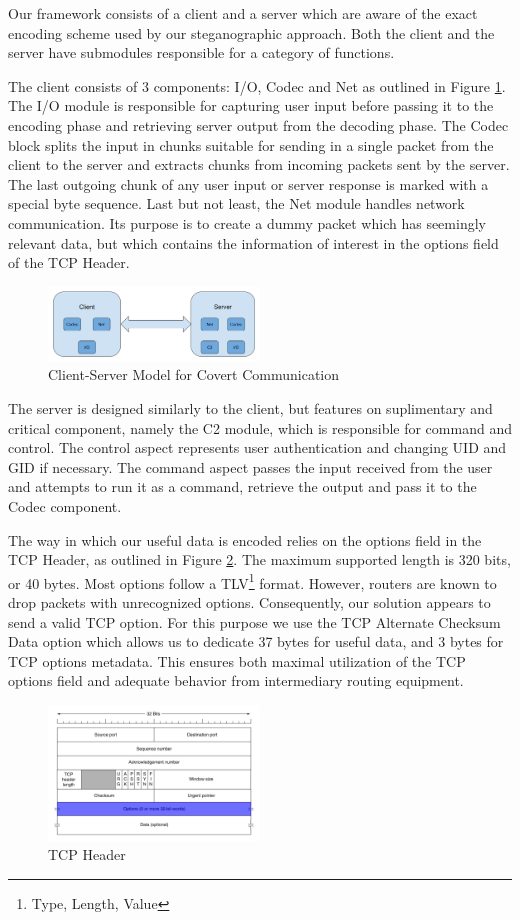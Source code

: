 
Our framework consists of a client and a server which are aware of the exact
encoding scheme used by our steganographic approach. Both the client and the
server have submodules responsible for a category of functions.

The client consists of 3 components: I/O, Codec and Net as outlined in Figure
\ref{fig:architecture}. The I/O module is responsible for capturing user input
before passing it to the encoding phase and retrieving server output from the
decoding phase. The Codec block splits the input in chunks suitable for sending
in a single packet from the client to the server and extracts chunks from
incoming packets sent by the server. The last outgoing chunk of any user input
or server response is marked with a special byte sequence. Last but not least,
the Net module handles network communication. Its purpose is to create a dummy
packet which has seemingly relevant data, but which contains the information of
interest in the options field of the TCP Header.

\begin{figure}
  \centering
  \includegraphics[width=0.5\textwidth]{img/client-server-architecture}
  \caption{Client-Server Model for Covert Communication}
  \label{fig:architecture}
\end{figure}

The server is designed similarly to the client, but features on suplimentary
and critical component, namely the C2 module, which is responsible for command
and control. The control aspect represents user authentication and changing
UID and GID if necessary. The command aspect passes the input received from the
user and attempts to run it as a command, retrieve the output and pass it to the
Codec component.

The way in which our useful data is encoded relies on the options field in the
TCP Header, as outlined in Figure \ref{fig:tcp-header}. The maximum supported
length is 320 bits, or 40 bytes. Most options follow a TLV\footnote{Type, Length, Value}
format. However, routers are known to drop packets with unrecognized options.
Consequently, our solution appears to send a valid TCP option. For this
purpose we use the TCP Alternate Checksum Data option which allows us to
dedicate 37 bytes for useful data, and 3 bytes for TCP options metadata.
This ensures both maximal utilization of the TCP options field and adequate
behavior from intermediary routing equipment.

\begin{figure}
  \centering
  \includegraphics[width=0.5\textwidth]{img/tcp-header}
  \caption{TCP Header}
  \label{fig:tcp-header}
\end{figure}
